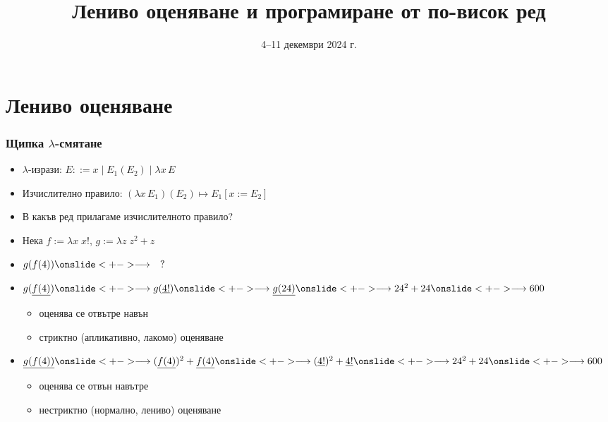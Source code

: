 \documentclass[alsotrans,beameroptions={aspectratio=169}]{beamerswitch}
\title[Лениво оценяване]{Лениво оценяване и програмиране от по-висок ред}
\date{4--11 декември 2024 г.}
\newcommand{\lra}{\onslide<+->$\longrightarrow$\xspace}
\begin{document}
\begin{frame}
  \titlepage
\end{frame}

\section{Лениво оценяване}

\begin{frame}
  \frametitle{Щипка $\lambda$-смятане}

  \renewcommand{\lra}{\onslide<+->\longrightarrow\xspace}
  \begin{itemize}[<+->]
  \item $\lambda$-изрази: $E ::= x \;|\; E_1(E_2) \;|\; \lambda x\, E$
  \item Изчислително правило: $(\lambda x\,E_1)(E_2) \mapsto E_1[x := E_2]$
  \item В какъв ред прилагаме изчислителното правило?
  \item Нека $f := \lambda x\; x!$, $g := \lambda z\;z^2+z$
  \item $g(f(4)) \lra \quad ?$
  \item $g(\underline{f(4)})
    \lra g(\underline{4!})
    \lra \underline{g(24)}
    \lra 24^2 + 24
    \lra 600$
    \begin{itemize}
    \item<16-> оценява се \alert{отвътре навън}
    \item<17-> \alert{стриктно} (апликативно, лакомо) оценяване
    \end{itemize}
  \item $\underline{g(f(4))}
    \lra (\underline{f(4)})^2 + \underline{f(4)}
    \lra (\underline{4!})^2 + \underline{4!}
    \lra 24^2 + 24
    \lra 600$
    \begin{itemize}
    \item<16-> оценява се \alert{отвън навътре}
    \item<17-> \alert{нестриктно} (нормално, лениво) оценяване
    \end{itemize}
  \end{itemize}
\end{frame}
\end{document}
